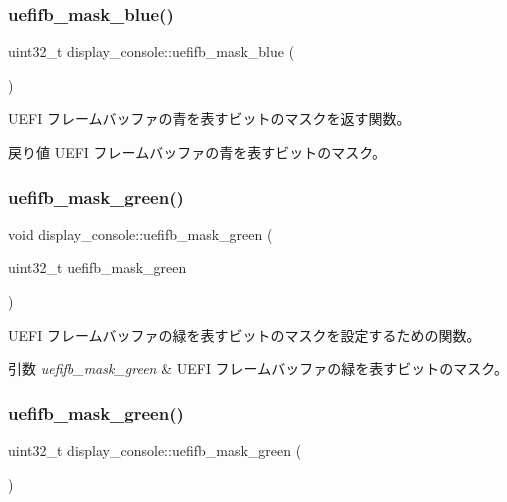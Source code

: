 \subsubsection{\texorpdfstring{uefifb\+\_\+mask\+\_\+blue()}{uefifb\_mask\_blue()}\hspace{0.1cm}{\footnotesize\ttfamily [2/2]}}
{\footnotesize\ttfamily uint32\+\_\+t display\+\_\+console\+::uefifb\+\_\+mask\+\_\+blue (\begin{DoxyParamCaption}{ }\end{DoxyParamCaption})}

U\+E\+FI フレームバッファの青を表すビットのマスクを返す関数。 \begin{DoxyReturn}{戻り値}
U\+E\+FI フレームバッファの青を表すビットのマスク。 
\end{DoxyReturn}
\hypertarget{classdisplay__console_af343b289cbb2c9dfd4ab3851ab0586a3}{}\label{classdisplay__console_af343b289cbb2c9dfd4ab3851ab0586a3} 
\subsubsection{\texorpdfstring{uefifb\+\_\+mask\+\_\+green()}{uefifb\_mask\_green()}\hspace{0.1cm}{\footnotesize\ttfamily [1/2]}}
{\footnotesize\ttfamily void display\+\_\+console\+::uefifb\+\_\+mask\+\_\+green (\begin{DoxyParamCaption}\item[{uint32\+\_\+t}]{uefifb\+\_\+mask\+\_\+green }\end{DoxyParamCaption})}

U\+E\+FI フレームバッファの緑を表すビットのマスクを設定するための関数。 
\begin{DoxyParams}{引数}
{\em uefifb\+\_\+mask\+\_\+green} & U\+E\+FI フレームバッファの緑を表すビットのマスク。 \\
\hline
\end{DoxyParams}
\hypertarget{classdisplay__console_a8ca8cb1d5dd1f15a000cd8a6be9c80f5}{}\label{classdisplay__console_a8ca8cb1d5dd1f15a000cd8a6be9c80f5} 
\subsubsection{\texorpdfstring{uefifb\+\_\+mask\+\_\+green()}{uefifb\_mask\_green()}\hspace{0.1cm}{\footnotesize\ttfamily [2/2]}}
{\footnotesize\ttfamily uint32\+\_\+t display\+\_\+console\+::uefifb\+\_\+mask\+\_\+green (\begin{DoxyParamCaption}{ }\end{DoxyParamCaption})}

